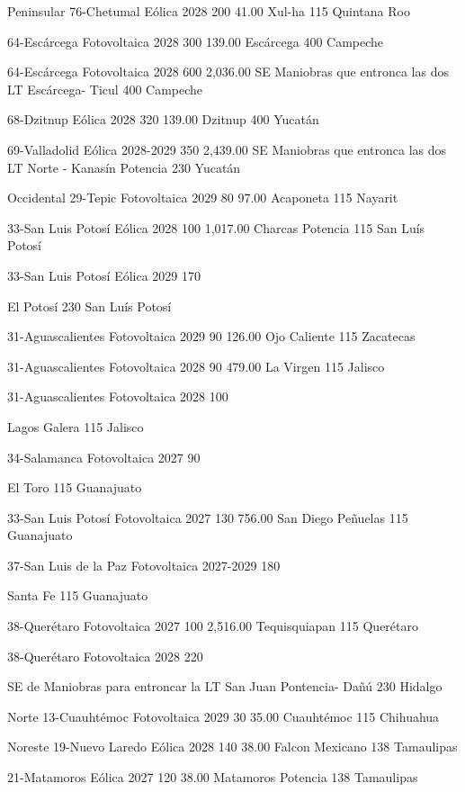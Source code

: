  Peninsular
 76-Chetumal
 Eólica
 2028
 200
 41.00
 Xul-ha
 115
 Quintana Roo
 
 
 64-Escárcega
 Fotovoltaica
 2028
 300
 139.00
 Escárcega
 400
 Campeche
 
 
 64-Escárcega
 Fotovoltaica
 2028
 600
 2,036.00
 SE Maniobras que entronca las dos LT Escárcega- Ticul
 400
 Campeche
 
 
 68-Dzitnup
 Eólica
 2028
 320
 139.00
 Dzitnup
 400
 Yucatán
 
 
 69-Valladolid
 Eólica
 2028-2029
 350
 2,439.00
 SE Maniobras que entronca las dos LT Norte - Kanasín Potencia
 230
 Yucatán
 
 Occidental
 29-Tepic
 Fotovoltaica
 2029
 80
 97.00
 Acaponeta
 115
 Nayarit
 
 
 33-San Luis Potosí
 Eólica
 2028
 100
 1,017.00
 Charcas Potencia
 115
 San Luís Potosí
 
 
 33-San Luis Potosí
 Eólica
 2029
 170
 
 El Potosí
 230
 San Luís Potosí
 
 
 31-Aguascalientes
 Fotovoltaica
 2029
 90
 126.00
 Ojo Caliente
 115
 Zacatecas
 
 
 31-Aguascalientes
 Fotovoltaica
 2028
 90
 479.00
 La Virgen
 115
 Jalisco
 
 
 31-Aguascalientes
 Fotovoltaica
 2028
 100
 
 Lagos Galera
 115
 Jalisco
 
 
 34-Salamanca
 Fotovoltaica
 2027
 90
 
 El Toro
 115
 Guanajuato
 
 
 33-San Luis Potosí
 Fotovoltaica
 2027
 130
 756.00
 San Diego Peñuelas
 115
 Guanajuato
 
 
 37-San Luis de la Paz
 Fotovoltaica
 2027-2029
 180
 
 Santa Fe
 115
 Guanajuato
 
 
 38-Querétaro
 Fotovoltaica
 2027
 100
 2,516.00
 Tequisquiapan
 115
 Querétaro
 
 
 38-Querétaro
 Fotovoltaica
 2028
 220
 
 SE de Maniobras para entroncar la LT San Juan Pontencia- Dañú
 230
 Hidalgo
 
 Norte
 13-Cuauhtémoc
 Fotovoltaica
 2029
 30
 35.00
 Cuauhtémoc
 115
 Chihuahua
 
 Noreste
 19-Nuevo Laredo
 Eólica
 2028
 140
 38.00
 Falcon Mexicano
 138
 Tamaulipas
 
 
 21-Matamoros
 Eólica
 2027
 120
 38.00
 Matamoros Potencia
 138
 Tamaulipas
 
